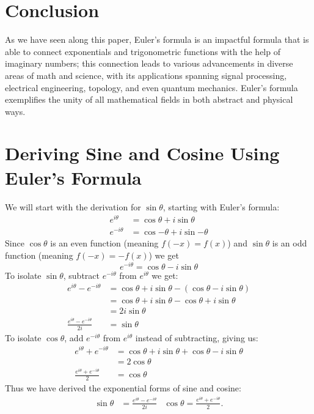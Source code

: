 \documentclass[12pt,a4paper]{article}
\begin{document}
\section{Conclusion}
As we have seen along this paper, Euler's formula is an impactful formula that is able to connect exponentials and trigonometric functions with the help of imaginary numbers; this connection leads to various advancements in diverse areas of math and science, with its applications spanning signal processing, electrical engineering, topology, and even quantum mechanics. Euler's formula exemplifies the unity of all mathematical fields in both abstract and physical ways.

\appendix
{}
\section{Deriving Sine and Cosine Using Euler’s Formula}\label{app:AppendixA}
We will start with the derivation for $\sin{\theta}$, starting with Euler's formula:
\begin{align*}
e^{i\theta} &= \cos{\theta} + i\sin{\theta}\\
e^{-i\theta} &= \cos{-\theta} + i\sin{-\theta}
\end{align*}
Since $\cos{\theta}$ is an even function (meaning $f(-x) =f(x)$) and $\sin{\theta}$ is an odd function (meaning $f(-x) = -f(x)$) we get
\[
e^{-i\theta} = \cos{\theta} - i\sin{\theta}
\]
To isolate $\sin{\theta}$, subtract $e^{-i\theta}$ from $e^{i\theta}$ we get:
\begin{align*}
e^{i\theta} - e^{-i\theta} &= \cos{\theta} + i\sin{\theta} - (\cos{\theta} - i\sin{\theta})\\
&= \cos{\theta} + i\sin{\theta} - \cos{\theta} + i\sin{\theta}\\
&= 2i\sin{\theta}\\
\frac{e^{i\theta} - e^{-i\theta}}{2i} &= \sin{\theta}
\end{align*}
To isolate $\cos{\theta}$, add $e^{-i\theta}$ from $e^{i\theta}$ instead of subtracting, giving us:
\begin{align*}
e^{i\theta} + e^{-i\theta} &= \cos{\theta} + i\sin{\theta} + \cos{\theta} - i\sin{\theta}\\
&= 2\cos{\theta}\\
\frac{e^{i\theta} + e^{-i\theta}}{2} &= \cos{\theta}
\end{align*}
Thus we have derived the exponential forms of sine and cosine:
\begin{align*}
\sin{\theta} &= \frac{e^{i\theta} - e^{-i\theta}}{2i} & \cos{\theta} = \frac{e^{i\theta} + e^{-i\theta}}{2}.
\end{align*}
\end{document}
